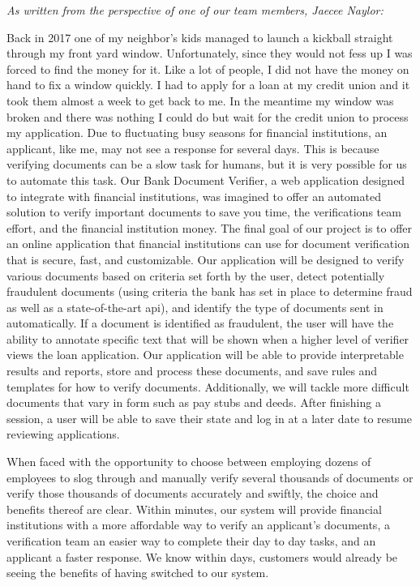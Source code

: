 \textit{As written from the perspective of one of our team members, Jaecee Naylor:}

Back in 2017 one of my neighbor’s kids managed to launch a kickball straight through my front yard window. Unfortunately, since they would not fess up I was forced to find the money for it. Like a lot of people, I did not have the money on hand to fix a window quickly. I had to apply for a loan at my credit union and it took them almost a week to get back to me. In the meantime my window was broken and there was nothing I could do but wait for the credit union to process my application. Due to fluctuating busy seasons for financial institutions, an applicant, like me, may not see a response for several days. This is because verifying documents can be a slow task for humans, but it is very possible for us to automate this task. Our Bank Document Verifier, a web application designed to integrate with financial institutions, was imagined to offer an automated solution to verify important documents to save you time, the verifications team effort, and the financial institution money. The final goal of our project is to offer an online application that financial institutions can use for document verification that is secure, fast, and customizable. Our application will be designed to verify various documents based on criteria set forth by the user, detect potentially fraudulent documents (using criteria the bank has set in place to determine fraud as well as a state-of-the-art api), and identify the type of documents sent in automatically. If a document is identified as fraudulent, the user will have the ability to annotate specific text that will be shown when a higher level of verifier views the loan application. Our application will be able to provide interpretable results and reports, store and process these documents, and save rules and templates for how to verify documents. Additionally, we will tackle more difficult documents that vary in form such as pay stubs and deeds. After finishing a session, a user will be able to save their state and log in at a later date to resume reviewing applications.

When faced with the opportunity to choose between employing dozens of employees to slog through and manually verify several thousands of documents or verify those thousands of documents accurately and swiftly, the choice and benefits thereof are clear. Within minutes, our system will provide financial institutions with a more affordable way to verify an applicant’s documents, a verification team an easier way to complete their day to day tasks, and an applicant a faster response. We know within days, customers would already be seeing the benefits of having switched to our system.